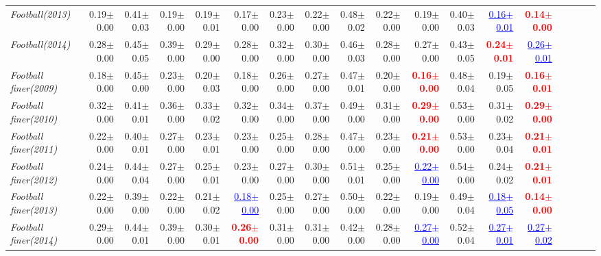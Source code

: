 \documentclass[nohyperref]{article}
\theoremstyle{plain}
\theoremstyle{definition}
\theoremstyle{remark}
\newcommand{\red}[1]{\textcolor{red}{\textbf{#1}}}
\newcommand{\blue}[1]{\textcolor{blue}{\underline{#1}}}
\begin{document}
\begin{table*}[!ht]
{\begin{tabular}{lrrrrrrrrrrrrrrrrr}
			{\it Football(2013)} & 0.19$\pm$0.00 & 0.41$\pm$0.03 & 0.19$\pm$0.00 & 0.19$\pm$0.01 & 0.17$\pm$0.00 & 0.23$\pm$0.00 & 0.22$\pm$0.00 & 0.48$\pm$0.02 & 0.22$\pm$0.00 & 0.19$\pm$0.00 & 0.40$\pm$0.03 & \blue{0.16$\pm$0.01} & \red{0.14$\pm$0.00} \\
			{\it Football(2014)} & 0.28$\pm$0.00 & 0.45$\pm$0.05 & 0.39$\pm$0.00 & 0.29$\pm$0.00 & 0.28$\pm$0.00 & 0.32$\pm$0.00 & 0.30$\pm$0.00 & 0.46$\pm$0.03 & 0.28$\pm$0.00 & 0.27$\pm$0.00 & 0.43$\pm$0.05 & \red{0.24$\pm$0.01} & \blue{0.26$\pm$0.01} \\
			{\it Football finer(2009)} & 0.18$\pm$0.00 & 0.45$\pm$0.00 & 0.23$\pm$0.00 & 0.20$\pm$0.03 & 0.18$\pm$0.00 & 0.26$\pm$0.00 & 0.27$\pm$0.00 & 0.47$\pm$0.01 & 0.20$\pm$0.00 & \red{0.16$\pm$0.00} & 0.48$\pm$0.04 & 0.19$\pm$0.05 & \red{0.16$\pm$0.01} \\
			{\it Football finer(2010)} & 0.32$\pm$0.00 & 0.41$\pm$0.01 & 0.36$\pm$0.00 & 0.33$\pm$0.02 & 0.32$\pm$0.00 & 0.34$\pm$0.00 & 0.37$\pm$0.00 & 0.49$\pm$0.00 & 0.31$\pm$0.00 & \red{0.29$\pm$0.00} & 0.53$\pm$0.00 & 0.31$\pm$0.02 & \red{0.29$\pm$0.00} \\
			{\it Football finer(2011)} & 0.22$\pm$0.00 & 0.40$\pm$0.01 & 0.27$\pm$0.00 & 0.23$\pm$0.01 & 0.23$\pm$0.00 & 0.25$\pm$0.00 & 0.28$\pm$0.00 & 0.47$\pm$0.00 & 0.23$\pm$0.00 & \red{0.21$\pm$0.00} & 0.53$\pm$0.00 & 0.23$\pm$0.04 & \red{0.21$\pm$0.01} \\
			{\it Football finer(2012)} & 0.24$\pm$0.00 & 0.44$\pm$0.04 & 0.27$\pm$0.00 & 0.25$\pm$0.01 & 0.23$\pm$0.00 & 0.27$\pm$0.00 & 0.30$\pm$0.00 & 0.51$\pm$0.01 & 0.25$\pm$0.00 & \blue{0.22$\pm$0.00} & 0.54$\pm$0.00 & 0.24$\pm$0.02 & \red{0.21$\pm$0.01} \\
			{\it Football finer(2013)} & 0.22$\pm$0.00 & 0.39$\pm$0.00 & 0.22$\pm$0.00 & 0.21$\pm$0.02 & \blue{0.18$\pm$0.00} & 0.25$\pm$0.00 & 0.27$\pm$0.00 & 0.50$\pm$0.00 & 0.22$\pm$0.00 & 0.19$\pm$0.00 & 0.49$\pm$0.04 & \blue{0.18$\pm$0.05} & \red{0.14$\pm$0.00} \\
			{\it Football finer(2014)} & 0.29$\pm$0.00 & 0.44$\pm$0.01 & 0.39$\pm$0.00 & 0.30$\pm$0.01 & \red{0.26$\pm$0.00} & 0.31$\pm$0.00 & 0.31$\pm$0.00 & 0.42$\pm$0.00 & 0.28$\pm$0.00 & \blue{0.27$\pm$0.00} & 0.52$\pm$0.04 & \blue{0.27$\pm$0.01} & \blue{0.27$\pm$0.02} \\
\bottomrule
\end{tabular}}
\end{table*}
\end{document}
